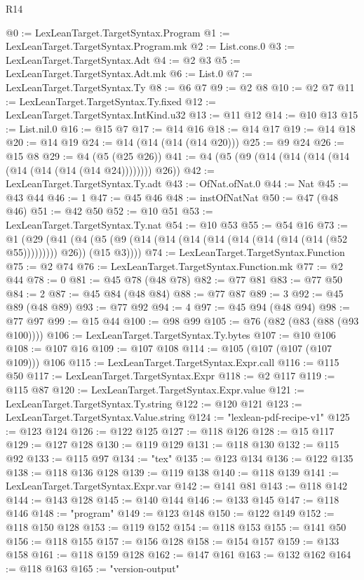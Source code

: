 \begin{lexlean}{R14}
\begin{coremodule}
@0 := LexLeanTarget.TargetSyntax.Program
@1 := LexLeanTarget.TargetSyntax.Program.mk
@2 := List.cons.{0}
@3 := LexLeanTarget.TargetSyntax.Adt
@4 := @2 @3
@5 := LexLeanTarget.TargetSyntax.Adt.mk
@6 := List.{0}
@7 := LexLeanTarget.TargetSyntax.Ty
@8 := @6 @7
@9 := @2 @8
@10 := @2 @7
@11 := LexLeanTarget.TargetSyntax.Ty.fixed
@12 := LexLeanTarget.TargetSyntax.IntKind.u32
@13 := @11 @12
@14 := @10 @13
@15 := List.nil.{0}
@16 := @15 @7
@17 := @14 @16
@18 := @14 @17
@19 := @14 @18
@20 := @14 @19
@24 := @14 (@14 (@14 (@14 @20)))
@25 := @9 @24
@26 := @15 @8
@29 := @4 (@5 (@25 @26))
@41 := @4 (@5 (@9 (@14 (@14 (@14 (@14 (@14 (@14 (@14 (@14 @24)))))))) @26))
@42 := LexLeanTarget.TargetSyntax.Ty.adt
@43 := OfNat.ofNat.{0}
@44 := Nat
@45 := @43 @44
@46 := 1
@47 := @45 @46
@48 := instOfNatNat
@50 := @47 (@48 @46)
@51 := @42 @50
@52 := @10 @51
@53 := LexLeanTarget.TargetSyntax.Ty.nat
@54 := @10 @53
@55 := @54 @16
@73 := @1
    (@29
      (@41 (@4 (@5 (@9 (@14 (@14 (@14 (@14 (@14 (@14 (@14 (@14 (@52 @55))))))))) @26)) (@15 @3))))
@74 := LexLeanTarget.TargetSyntax.Function
@75 := @2 @74
@76 := LexLeanTarget.TargetSyntax.Function.mk
@77 := @2 @44
@78 := 0
@81 := @45 @78 (@48 @78)
@82 := @77 @81
@83 := @77 @50
@84 := 2
@87 := @45 @84 (@48 @84)
@88 := @77 @87
@89 := 3
@92 := @45 @89 (@48 @89)
@93 := @77 @92
@94 := 4
@97 := @45 @94 (@48 @94)
@98 := @77 @97
@99 := @15 @44
@100 := @98 @99
@105 := @76 (@82 (@83 (@88 (@93 @100))))
@106 := LexLeanTarget.TargetSyntax.Ty.bytes
@107 := @10 @106
@108 := @107 @16
@109 := @107 @108
@114 := @105 (@107 (@107 (@107 @109))) @106
@115 := LexLeanTarget.TargetSyntax.Expr.call
@116 := @115 @50
@117 := LexLeanTarget.TargetSyntax.Expr
@118 := @2 @117
@119 := @115 @87
@120 := LexLeanTarget.TargetSyntax.Expr.value
@121 := LexLeanTarget.TargetSyntax.Ty.string
@122 := @120 @121
@123 := LexLeanTarget.TargetSyntax.Value.string
@124 := "lexlean-pdf-recipe-v1"
@125 := @123 @124
@126 := @122 @125
@127 := @118 @126
@128 := @15 @117
@129 := @127 @128
@130 := @119 @129
@131 := @118 @130
@132 := @115 @92
@133 := @115 @97
@134 := "tex"
@135 := @123 @134
@136 := @122 @135
@138 := @118 @136 @128
@139 := @119 @138
@140 := @118 @139
@141 := LexLeanTarget.TargetSyntax.Expr.var
@142 := @141 @81
@143 := @118 @142
@144 := @143 @128
@145 := @140 @144
@146 := @133 @145
@147 := @118 @146
@148 := "program"
@149 := @123 @148
@150 := @122 @149
@152 := @118 @150 @128
@153 := @119 @152
@154 := @118 @153
@155 := @141 @50
@156 := @118 @155
@157 := @156 @128
@158 := @154 @157
@159 := @133 @158
@161 := @118 @159 @128
@162 := @147 @161
@163 := @132 @162
@164 := @118 @163
@165 := "version-output"

\end{coremodule}
\end{lexlean}

